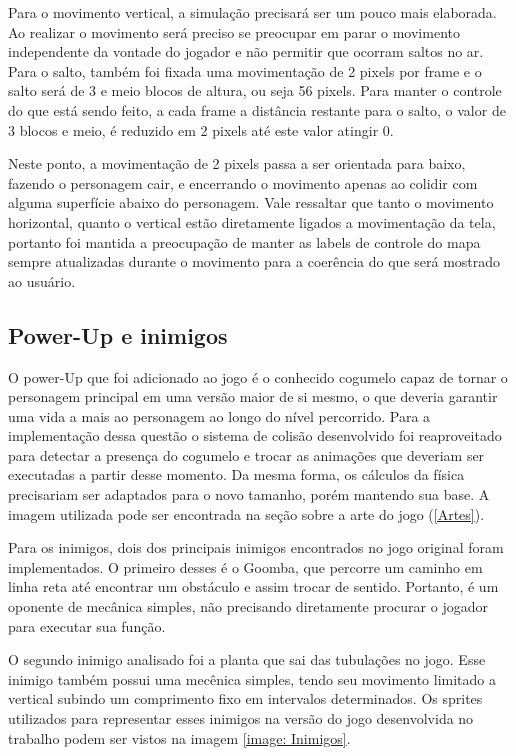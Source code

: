 \documentclass[11pt, twocolumn]{extarticle}
\begin{document}
Para o movimento vertical, a simulação precisará ser um pouco mais elaborada. Ao realizar o movimento será preciso se preocupar em parar o movimento independente da vontade do jogador e não permitir que ocorram saltos no ar. Para o salto, também foi fixada uma movimentação de 2 pixels por frame e o salto será de 3 e meio blocos de altura, ou seja 56 pixels. Para manter o controle do que está sendo feito, a cada frame a distância restante para o salto, o valor de 3 blocos e meio, é reduzido em 2 pixels até este valor atingir 0.

Neste ponto, a movimentação de 2 pixels passa a ser orientada para baixo, fazendo o personagem cair, e encerrando o movimento apenas ao colidir com alguma superfície abaixo do personagem. Vale ressaltar que tanto o movimento horizontal, quanto o vertical estão diretamente ligados a movimentação da tela, portanto foi mantida a preocupação de manter as labels de controle do mapa sempre atualizadas durante o movimento para a coerência do que será mostrado ao usuário.

\subsection{Power-Up e inimigos}
\indent \indent O power-Up que foi adicionado ao jogo é o conhecido cogumelo capaz de tornar o personagem principal em uma versão maior de si mesmo, o que deveria garantir uma vida a mais ao personagem ao longo do nível percorrido. Para a implementação dessa questão o sistema de colisão desenvolvido foi reaproveitado para detectar a presença do cogumelo e trocar as animações que deveriam ser executadas a partir desse momento. Da mesma forma, os cálculos da física precisariam ser adaptados para o novo tamanho, porém mantendo sua base. A imagem utilizada pode ser encontrada na seção sobre a arte do jogo (\ref{Artes}).

Para os inimigos, dois dos principais inimigos encontrados no jogo original foram implementados. O primeiro desses é o Goomba, que percorre um caminho em linha reta até encontrar um obstáculo e assim trocar de sentido. Portanto, é um oponente de mecânica simples, não precisando diretamente procurar o jogador para executar sua função.

O segundo inimigo analisado foi a planta que sai das tubulações no jogo. Esse inimigo também possui uma mecênica simples, tendo seu movimento limitado a vertical subindo um comprimento fixo em intervalos determinados. Os sprites utilizados para representar esses inimigos na versão do jogo desenvolvida no trabalho podem ser vistos na imagem \ref{image: Inimigos}.
\end{document}
